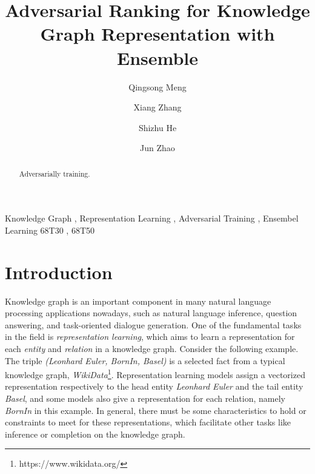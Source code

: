 \documentclass[twocolumn,a4paper,10pt,review,5p]{elsarticle}
\begin{document}

\begin{frontmatter}

\title{Adversarial Ranking for Knowledge Graph Representation with Ensemble}


\author[hrbaddress]{Qingsong Meng}

\author[ucasaddress,hrbaddress]{Xiang Zhang}

\author[ucasaddress]{Shizhu He}

\author[ucasaddress]{Jun Zhao}

\address[hrbaddress]{Harbin University of Science and Technology, No.52 Xuefu Road, Nangang District, Harbin, 150080, China}
\address[ucasaddress]{University of Chinese Academy of Sciences, No.19(A) Yuquan Road, Shijingshan District, Beijing, P.R.China 100049}


\begin{abstract}
Adversarially training.
\end{abstract}

\begin{keyword}
Knowledge Graph \sep{} Representation Learning \sep{} Adversarial Training \sep{} Ensembel Learning
\MSC[2010] 68T30 \sep{} 68T50
\end{keyword}

\end{frontmatter}


\linenumbers{}


\section{Introduction}
\label{sec:intro}

Knowledge graph is an important component in many natural language processing applications nowadays, such as natural language inference, question answering, and task-oriented dialogue generation. One of the fundamental tasks in the field is \emph{representation learning}, which aims to learn a representation for each \emph{entity} and \emph{relation} in a knowledge graph. Consider the following example. The triple \emph{(Leonhard Euler, BornIn, Basel)} is a selected fact from a typical knowledge graph, \emph{WikiData}\footnote{https://www.wikidata.org/}. Representation learning models assign a vectorized representation respectively to the head entity \emph{Leonhard Euler} and the tail entity \emph{Basel}, and some models also give a representation for each relation, namely \emph{BornIn} in this example. In general, there must be some characteristics to hold or constraints to meet for these representations, which facilitate other tasks like inference or completion on the knowledge graph.
\end{document}
